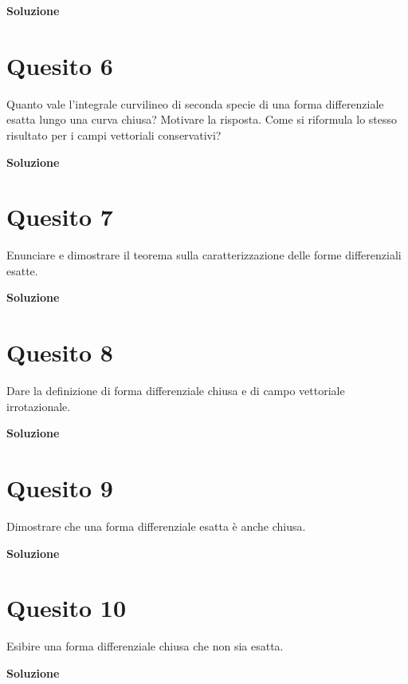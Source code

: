 \medskip
\begin{large}
\textbf{Soluzione}
\end{large}


\section*{Quesito 6}
Quanto vale l’integrale curvilineo di seconda specie di una forma differenziale
esatta lungo una curva chiusa? Motivare la risposta. Come si riformula lo stesso risultato
per i campi vettoriali conservativi?

\medskip
\begin{large}
\textbf{Soluzione}
\end{large}


\section*{Quesito 7}
Enunciare e dimostrare il teorema sulla caratterizzazione delle forme differenziali esatte.

\medskip
\begin{large}
\textbf{Soluzione}
\end{large}


\section*{Quesito 8}
Dare la definizione di forma differenziale chiusa e di campo vettoriale irrotazionale.

\medskip
\begin{large}
\textbf{Soluzione}
\end{large}


\section*{Quesito 9}
Dimostrare che una forma differenziale esatta è anche chiusa.

\medskip
\begin{large}
\textbf{Soluzione}
\end{large}


\section*{Quesito 10}
Esibire una forma differenziale chiusa che non sia esatta.

\medskip
\begin{large}
\textbf{Soluzione}
\end{large}
